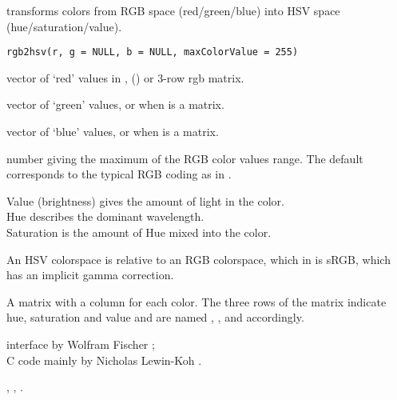 %
\begin{Description}\relax
{} transforms colors
from RGB space (red/green/blue)
into HSV space (hue/saturation/value).
\end{Description}
%
\begin{Usage}
\begin{verbatim}
rgb2hsv(r, g = NULL, b = NULL, maxColorValue = 255)
\end{verbatim}
\end{Usage}
%
\begin{Arguments}
\begin{ldescription}
\item[\code{r}] vector of `red' values in \eqn{[0, M]}{}, () or 3-row rgb matrix.
\item[\code{g}] vector of `green' values, or  when
 is a matrix.
\item[\code{b}] vector of `blue' values, or  when
 is a matrix.
\item[\code{maxColorValue}] number giving the maximum of the RGB color values
range.  The default  corresponds to the typical 
RGB coding as in .
\end{ldescription}
\end{Arguments}
%
\begin{Details}\relax
Value (brightness) gives the amount of light in the color.\\{}
Hue describes the dominant wavelength.\\{}
Saturation is the amount of Hue mixed into the color.

An HSV colorspace is relative to an RGB colorspace, which in \R{}
is sRGB, which has an implicit gamma correction.
\end{Details}
%
\begin{Value}
A matrix with a column for each color.  The three rows of the matrix
indicate hue, saturation and value and are named ,
, and  accordingly.
\end{Value}
%
\begin{Author}\relax
\R{} interface by Wolfram Fischer ;\\{}
C code mainly by Nicholas Lewin-Koh .
\end{Author}
%
\begin{SeeAlso}\relax
{}, , .
\end{SeeAlso}
